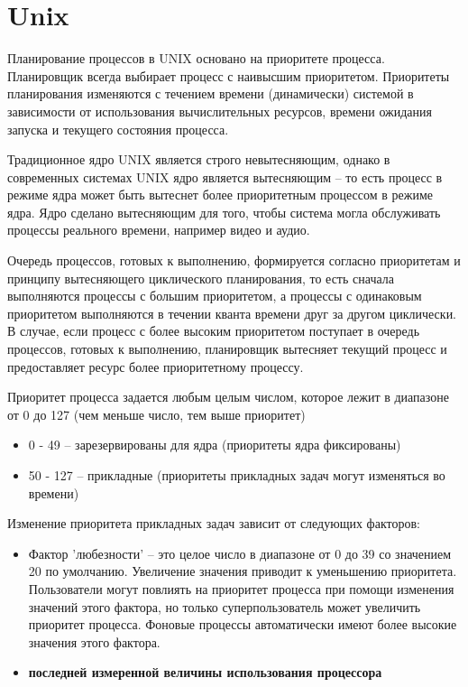 \section{Unix}

Планирование процессов в UNIX основано на приоритете процесса. Планировщик всегда выбирает процесс с наивысшим приоритетом. Приоритеты планирования изменяются с течением времени (динамически) системой в зависимости от использования вычислительных ресурсов, времени ожидания запуска и текущего состояния процесса. 

Традиционное ядро UNIX является строго невытесняющим, однако в современных системах UNIX ядро является вытесняющим -- то есть процесс в режиме ядра может быть вытеснет более приоритетным процессом в режиме ядра. Ядро сделано вытесняющим для того, чтобы система могла обслуживать процессы реального времени, например видео и аудио.

Очередь процессов, готовых к выполнению, формируется согласно приоритетам и принципу вытесняющего циклического планирования, то есть сначала выполняются процессы с большим приоритетом, а процессы с одинаковым приоритетом выполняются в течении кванта времени друг за другом циклически. В случае, если процесс с более высоким приоритетом поступает в очередь процессов, готовых к выполнению, планировщик вытесняет текущий процесс и предоставляет ресурс более приоритетному процессу.

Приоритет процесса задается любым целым числом, которое лежит в диапазоне от 0 до 127 (чем меньше число, тем выше приоритет)
\begin{itemize}
	\item 0 - 49 -- зарезервированы для ядра (приоритеты ядра фиксированы)
	\item 50 - 127 -- прикладные  (приоритеты прикладных задач могут изменяться во времени)
\end{itemize}

Изменение приоритета прикладных задач зависит от следующих факторов:
\begin{itemize}
	\item Фактор 'любезности' -- это целое число в диапазоне от 0 до 39 со значением 20 по умолчанию. Увеличение значения приводит к уменьшению приоритета. Пользователи могут повлиять на приоритет процесса при помощи изменения значений этого фактора, но только суперпользователь может увеличить приоритет процесса. Фоновые процессы автоматически имеют более высокие значения этого фактора.
	\item \textbf{последней измеренной величины использования процессора} 
\end{itemize}


